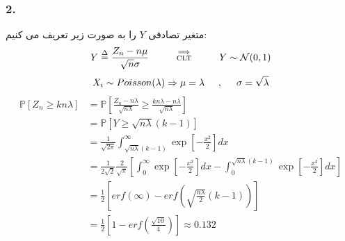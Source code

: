\documentclass[]{article}
\begin{document}
	\subsubsection{2.}
	متغیر تصادفی $Y$ را به صورت زیر تعریف می کنیم:
	\begin{equation}
		\nonumber
		Y \overset{\Delta}{=} \frac{Z_n - n\mu}{\sqrt{n}\sigma} \hspace{1cm} \overset{\Longrightarrow}{\scriptsize \text{CLT}} \hspace{1cm} Y \sim \mathcal{N}(0, 1)
	\end{equation}
	\begin{equation}
		\nonumber
		X_i \sim Poisson(\lambda) \Rightarrow \mu = \lambda \hspace{0.5cm},\hspace{0.5cm} \sigma=\sqrt{\lambda}
	\end{equation}
	\begin{equation}
		\nonumber
		\begin{split}
			\mathbb{P}[Z_n \geqslant kn\lambda] & = \mathbb{P}[\frac{Z_n - n\lambda}{\sqrt{n\lambda}} \geqslant \frac{kn\lambda - n\lambda}{\sqrt{n\lambda}}]	\\
			& = \mathbb{P}[Y \geqslant \sqrt{n\lambda} (k-1)] \\
			& = \frac{1}{\sqrt{2\pi}} \int_{\sqrt{n\lambda} (k-1)}^{\infty} \exp[-\frac{x^2}{2}] dx \\
			& = \frac{1}{2\sqrt{2}} \frac{2}{\sqrt{\pi}}[\int_{0}^{\infty}\exp[-\frac{x^2}{2}] dx - \int_{0}^{\sqrt{n\lambda}(k-1)} \exp[-\frac{x^2}{2}]dx]	\\
			& = \frac{1}{2} [erf(\infty) - erf(\sqrt{\frac{n\lambda}{2}}(k-1))] \\
			& = \frac{1}{2} [1 - erf(\frac{\sqrt{10}}{4})] \approx 0.132
		\end{split}
	\end{equation}
	\newpage
\end{document}
